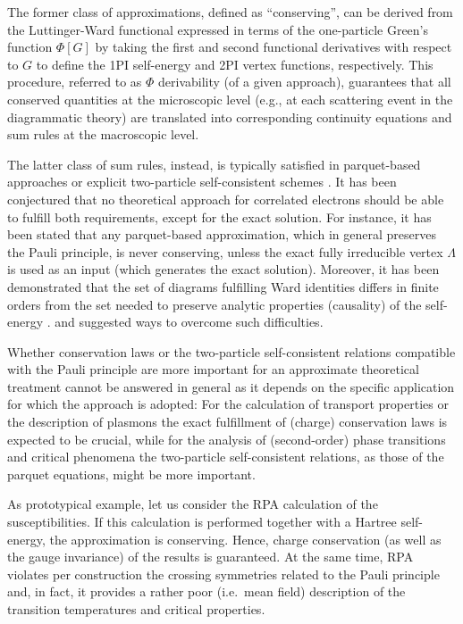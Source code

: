 \documentclass[rmp,aps,reprint,amsmath,amssymb,superscriptaddress,showpacs,nofootinbib]{revtex4-1}
\begin{document}
The former class of approximations, defined as ``conserving'', can be derived from the Luttinger-Ward functional expressed in terms of the one-particle Green's function $\Phi[G]$ by taking the first and second functional derivatives with respect to  $G$ to define the 1PI self-energy and 2PI vertex functions, respectively. This procedure, referred to as $\Phi$ derivability (of a given  approach), guarantees that all conserved quantities at the microscopic level (e.g., at each scattering event in the diagrammatic theory) are translated into corresponding continuity equations and sum rules at the macroscopic level.

The latter class of sum rules, instead, is typically   satisfied in parquet-based \cite{Bickers2004} approaches or explicit two-particle self-consistent schemes \cite{Vilk1994}. It has been conjectured \cite{Janis1999,Bickers2004} that  no theoretical approach for correlated electrons should be able to  fulfill both requirements, except for the exact solution.  For instance, it has been stated \cite{Smith1992,Janis1999} that any parquet-based approximation, which in general preserves the Pauli principle, is never conserving, unless the exact fully irreducible vertex $\Lambda$ is used as an input (which generates the exact solution). Moreover, it has been demonstrated that the set of diagrams fulfilling Ward identities differs in finite orders from the set needed to preserve analytic properties (causality) of the self-energy \cite{Janis2004}.  and  suggested ways to overcome such difficulties.

Whether conservation laws or the two-particle self-consistent relations compatible with the Pauli principle are more important for an approximate theoretical treatment cannot be answered in general as it depends on the specific application for which the approach is adopted: For the calculation of transport properties or the description of plasmons the exact fulfillment of (charge) conservation laws is expected to be crucial, while for the analysis of (second-order) phase transitions and critical phenomena the two-particle self-consistent relations, as those of the parquet equations, might be more important. 

As prototypical example, let us consider the RPA calculation of the susceptibilities. If this calculation is performed together with a  Hartree  self-energy, the approximation is conserving. Hence, charge conservation (as well as the gauge invariance) of the results is guaranteed. At the same time, RPA violates per construction the crossing symmetries related to the Pauli principle and, in fact, it provides a rather poor (i.e.\ mean field) description of the transition temperatures and critical properties.
\end{document}
